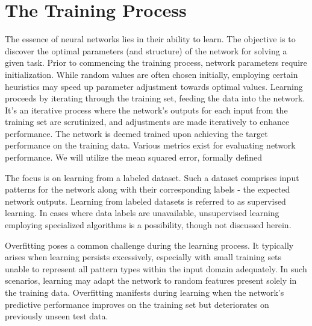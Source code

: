 \documentclass[a4paper]{report}
\begin{document}
{\section{The Training Process}
The essence of neural networks lies in their ability to learn. The objective is to discover the optimal parameters (and structure) of the network for solving a given task. Prior to commencing the training process, network parameters require initialization. While random values are often chosen initially, employing certain heuristics may speed up parameter adjustment towards optimal values. Learning proceeds by iterating through the training set, feeding the data into the network. It's an iterative process where the network's outputs for each input from the training set are scrutinized, and adjustments are made iteratively to enhance performance. The network is deemed trained upon achieving the target performance on the training data. Various metrics exist for evaluating network performance. We will utilize the mean squared error, formally defined

The focus is on learning from a labeled dataset. Such a dataset comprises input patterns for the network along with their corresponding labels - the expected network outputs. Learning from labeled datasets is referred to as supervised learning. In cases where data labels are unavailable, unsupervised learning employing specialized algorithms is a possibility, though not discussed herein.

Overfitting poses a common challenge during the learning process. It typically arises when learning persists excessively, especially with small training sets unable to represent all pattern types within the input domain adequately. In such scenarios, learning may adapt the network to random features present solely in the training data. Overfitting manifests during learning when the network's predictive performance improves on the training set but deteriorates on previously unseen test data.

}
\end{document}
